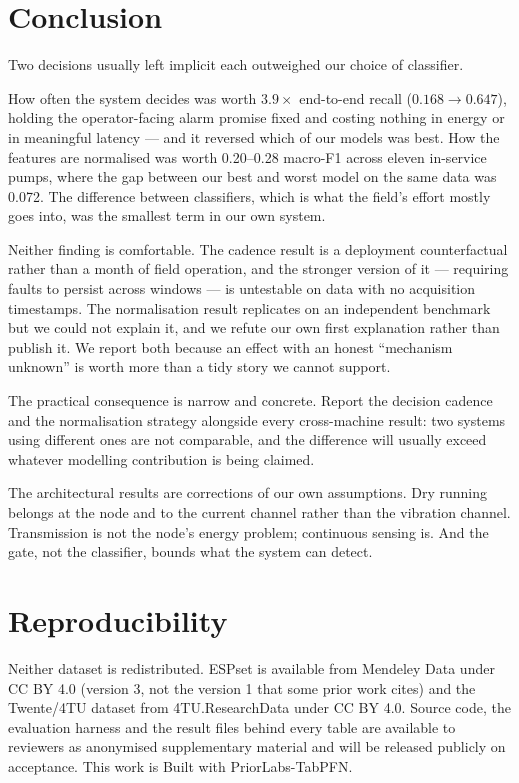 \documentclass[conference,a4paper,10pt]{IEEEtran}
\begin{document}
\section{Conclusion}
Two decisions usually left implicit each outweighed our choice of classifier.

How often the system decides was worth $3.9\times$ end-to-end recall
($0.168 \rightarrow 0.647$), holding the operator-facing alarm promise fixed and
costing nothing in energy or in meaningful latency --- and it reversed which of our
models was best. How the features are normalised
was worth 0.20--0.28 macro-F1 across eleven in-service pumps, where the gap between
our best and worst model on the same data was 0.072. The difference between
classifiers, which is what the field's effort mostly goes into, was the smallest
term in our own system.

Neither finding is comfortable. The cadence result is a deployment counterfactual
rather than a month of field operation, and the stronger version of it --- requiring
faults to persist across windows --- is untestable on data with no acquisition
timestamps. The normalisation result replicates on an independent benchmark but we
could not explain it, and we refute our own first explanation rather than publish
it. We report both because an effect with an honest ``mechanism unknown'' is worth
more than a tidy story we cannot support.

The practical consequence is narrow and concrete. Report the decision cadence and
the normalisation strategy alongside every cross-machine result: two systems using
different ones are not comparable, and the difference will usually exceed whatever
modelling contribution is being claimed.

The architectural results are corrections of our own assumptions. Dry running
belongs at the node and to the current channel rather than the vibration channel.
Transmission is not the node's energy problem; continuous sensing is. And the gate,
not the classifier, bounds what the system can detect.

\section*{Reproducibility}
Neither dataset is redistributed. ESPset is available from Mendeley Data under
CC BY 4.0 (version 3, not the version 1 that some prior work cites) and the
Twente/4TU dataset from 4TU.ResearchData under CC BY 4.0. Source code, the
evaluation harness and the result files behind every table are available to
reviewers as anonymised supplementary material and will be released publicly on
acceptance. This work is Built with PriorLabs-TabPFN.
\end{document}
